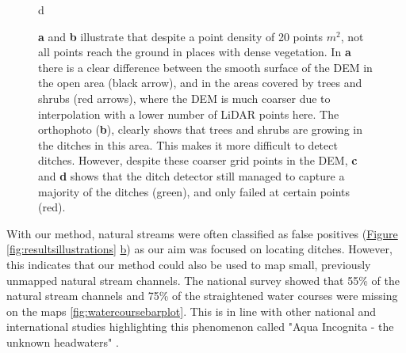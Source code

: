 \documentclass[11pt, review]{elsarticle} %
\providecommand{\DIFaddtex}[1]{{\protect\color{blue}\uwave{#1}}} %
\providecommand{\DIFaddbegin}{} %
\providecommand{\DIFaddend}{} %
\providecommand{\DIFaddendFL}{} %
\providecommand{\DIFadd}[1]{\texorpdfstring{\DIFaddtex{#1}}{#1}} %
\begin{document}
\begin{figure}[!htb]
{    d}{
        }
    \DIFaddendFL \caption{\textbf{a} and \textbf{b} illustrate that despite a point density of 20 points $m^2$, not all points reach the ground in places with dense vegetation. In \textbf{a} there is a clear difference between the smooth surface of the DEM in the open area (black arrow), and in the areas covered by trees and shrubs (red arrows), where the DEM is much coarser due to interpolation with a lower number of LiDAR points here. The orthophoto (\textbf{b}), clearly shows that trees and shrubs are growing in the ditches in this area. This makes it more difficult to detect ditches. However, despite these coarser grid points in the DEM, \textbf{c} and \textbf{d} shows that the ditch detector still managed to capture a majority of the ditches (green), and only failed at certain points (red).}
    \label{fig:resultstreesbushes}
\end{figure}

With our method, natural streams were often classified as false positives (\hyperref[fig:resultsillustrations]{Figure} \ref{fig:resultsillustrations} \hyperref[fig:resultsillustrations]{b}) as our aim was focused on locating ditches. However, this indicates that our method could also be used to map small, previously unmapped natural stream channels. The national survey showed that 55\% of the natural stream channels and 75\% of the straightened water courses were missing on the maps \DIFaddbegin \DIFadd{(}\autoref{fig:watercoursebarplot}\DIFadd{)}\DIFaddend . This is in line with other national \citep{kuglerova} and international \citep{benstead} studies highlighting this phenomenon called "Aqua Incognita - the unknown headwaters" \citep{bishop,kuglerova}.
\end{document}
